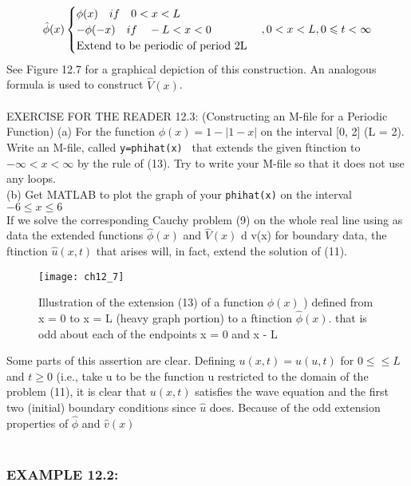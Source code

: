 \documentclass[../main.tex]{subfiles}
\begin{document}
\begin{equation} \label{eqa13}
\hat{\phi}(x)
	\begin{cases} 
\phi (x)   ~~~ if~~~ 0< x< L\\
-\phi (-x) ~~~ if ~~~ -L < x <0\\
$Extend to be periodic of period 2L$\\
\end{cases}		
,0 < x < L, 0\leqslant t  < \infty	
\end{equation}
See Figure 12.7 for a graphical depiction of this construction. An analogous
formula is used to construct $\hat{V}(x)$.\\
\\
EXERCISE FOR THE READER 12.3: (Constructing an M-file for a Periodic
Function) (a) For the function $\phi(x) = 1-|1-x|$ on the interval [0, 2] (L = 2).
Write an M-file, called \texttt{y=phihat(x) } that extends the given ftinction to $-\infty < x<\infty$  by the rule of (13). Try to write your M-file so that it does not use
any loops.
\\
(b) Get MATLAB to plot the graph of your \texttt{phihat(x)} on the interval  $-6\leqslant x \leqslant 6$\\

If we solve the corresponding Cauchy problem (9) on the whole real line using as
data the extended functions $\hat{\phi}(x)$ and $\hat{V}(x)$ d v(x) for boundary data, the ftinction $\hat{u}(x,t)$ that arises will, in fact, extend the solution of (11). 


\begin{figure}[H]
	\centering
	\texttt{[image: ch12\_7]}
	\caption{\textsf{  Illustration of the extension (13) of a function $\phi(x)$ ) defined from x = 0 to x
= L (heavy graph portion) to a ftinction $\hat{\phi}(x)$. that is odd about each of the endpoints x = 0
and x - L }}
	\label{pfig:ch12_7}
\end{figure}
Some parts of this assertion are clear. Defining $u(x,t) = \hat{u} (u,t)$ for $ 0\leqslant \leqslant L$ and $ t\geq 0$  (i.e., take u to be the function u restricted to the domain of the
problem (11), it is clear that $u(x,t)$ satisfies the wave equation and the first two
(initial) boundary conditions since $\hat{u}$ does. Because of the odd extension 
properties of $\hat{\phi}$ and $ \hat{v} (x)$ 
\\
\\
\subsubsection{EXAMPLE 12.2:}
\end{document}

